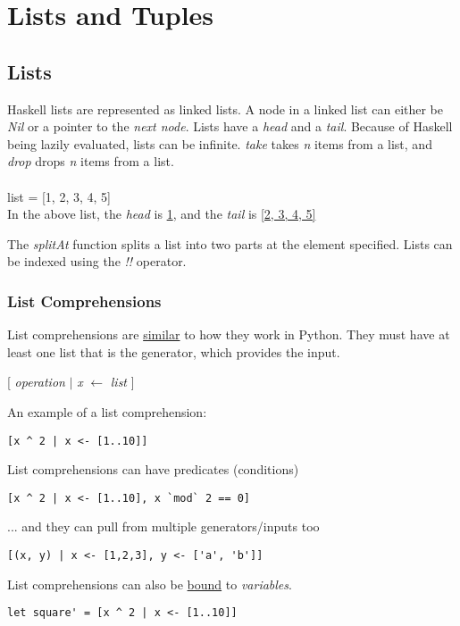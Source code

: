\section{Lists and Tuples}

\subsection{Lists}
Haskell lists are represented as linked lists.
A node in a linked list can either be \emph{Nil} or a pointer to the \emph{next node}. Lists have a \emph{head} and a \emph{tail}. Because of Haskell being lazily evaluated, lists can be infinite. \emph{take} takes \emph{n} items from a list, and \emph{drop} drops \emph{n} items from a list.\\
\\
list = [1, 2, 3, 4, 5]\\
In the above list, the \emph{head} is \underline{1}, and the \emph{tail} is \underline{[2, 3, 4, 5]}

The \emph{splitAt} function splits a list into two parts at the element specified.
Lists can be indexed using the \emph{!!} operator.

\subsubsection{List Comprehensions}
List comprehensions are \underline{similar} to how they work in Python.
They must have at least one list that is the generator, which provides
the input.

[ \emph{operation} $\vert$ \emph{x} $\leftarrow$ \emph{list} ]

An example of a list comprehension:
\begin{verbatim}
[x ^ 2 | x <- [1..10]]
\end{verbatim}

List comprehensions can have predicates (conditions)
\begin{verbatim}
[x ^ 2 | x <- [1..10], x `mod` 2 == 0]
\end{verbatim}

... and they can pull from multiple generators/inputs too
\begin{verbatim}
[(x, y) | x <- [1,2,3], y <- ['a', 'b']]
\end{verbatim}

List comprehensions can also be \underline{bound} to \emph{variables}.
\begin{lstlisting}
let square' = [x ^ 2 | x <- [1..10]]
\end{lstlisting}

